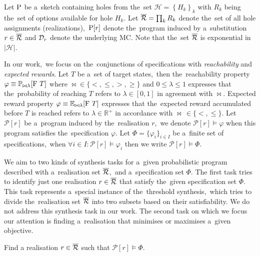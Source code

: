 \begin{definition}[Sketch]
Let $\mathrm{P}$ be a~sketch containing holes from the~set $\mathcal{H} = \left\{ H_k \right \}_k$ with $R_k$ being the~set of options available for hole $H_k$.
Let $\overline{\mathcal{R}} = \prod_k R_k$ denote the~set of all hole assignments (realizations),~$\mathrm{P}[r]$ denote the~program induced by a~substitution $r \in \overline{\mathcal{R}}$ and $\mathcal{D}_r$ denote the underlying MC.
Note that the~set $\overline{\mathcal{R}}$ is exponential in $\lvert \mathcal{H} \rvert$.
\end{definition}


\begin{definition}[Specification]
In our work,~we focus on the~conjunctions of specifications with \textit{reachability} and \textit{expected rewards}.
Let $T$ be a~set of target states,~then the~reachability property $\varphi \equiv \mathbb{P}_{\bowtie \lambda}[\mathrm{F}\ T]$ where $\bowtie \in \{<, \leq, >, \geq\}$ and $0 \leq \lambda \leq 1$ expresses that the~probability of reaching $T$ refers to $\lambda \in [0,1]$ in agreement with $\bowtie$.
Expected reward property $\varphi \equiv \mathbb{E}_{\bowtie \lambda}[\mathrm{F}\ T]$ expresses that the~expected reward accumulated before $T$ is reached refers to $\lambda \in \mathbb{R}^+$ in accordance with $\bowtie \, \in \{<, \leq \}$.
Let $\mathcal{P}[r]$ be a~program induced by the~realisation $r$,~we denote $\mathcal{P}[r] \models \varphi$ when this program satisfies the~specification $\varphi$.
Let $\varPhi = \{ \varphi_i \}_{i \in I}$ be a~finite set of specifications,~when $\forall i \in I: \mathcal{P}[r] \models \varphi_i$ then we write $\mathcal{P}[r] \models \varPhi$.
\end{definition}

We aim to two kinds of synthesis tasks for a~given probabilistic program described with a~realisation set $\overline{\mathcal{R}}$,~and a~specification set $\varPhi$.
The first task tries to identify just one realisation $r \in \overline{\mathcal{R}}$ that satisfy the~given specification set $\varPhi$.
This task represents a~special instance of the~threshold synthesis,~which tries to divide the~realisation set $\overline{\mathcal{R}}$ into two subsets based on their satisfiability.
We do not address this synthesis task in our work.
The second task on which we focus our attention is finding a~realisation that minimises or maximises a~given objective.

\begin{definition}[Feasibility]
Find a realisation $r \in \overline{\mathcal{R}}$ such that $\mathcal{P}[r] \models \varPhi$. 
\end{definition}

